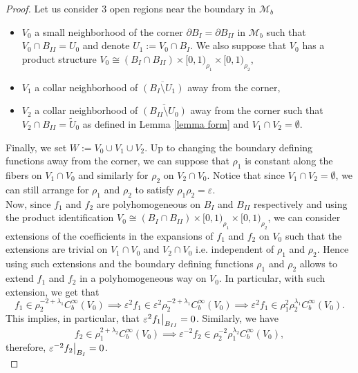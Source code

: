 \documentclass[a4paper,11pt]{article}
\newcommand\restr[2]{{%
  \left.\kern-\nulldelimiterspace %
  #1 %
  \littletaller %
  \right|_{#2} %
  }}
\newcommand{\littletaller}{\mathchoice{\vphantom{\big|}}{}{}{}}
\begin{document}
\begin{proof}
Let us consider $3$ open regions near the boundary in $\mathcal{M}_b$
\begin{itemize}
    \item $V_0$ a small neighborhood of the corner $\partial B_I= \partial B_{II}$ in $\mathcal{M}_b$ such that $V_0 \cap B_{II} = U_0$ and denote $U_1 := V_0 \cap B_{I}$. We also suppose that $V_0$ has a product structure $V_0 \cong (B_I \cap B_{II}) \times [0,1)_{\rho_1} \times  [0,1)_{\rho_2}$,
    \item $V_1$ a collar neighborhood of $\overline{(B_{I} \setminus U_1)}$ away from the corner,
    \item $V_2$ a collar neighborhood of $\overline{(B_{II} \setminus U_0)}$ away from the corner such that $V_2 \cap B_{II} = \tilde U_0$ as defined in Lemma \ref{lemma form} and $V_1 \cap V_2 = \emptyset$.
\end{itemize} 
Finally, we set $W:= V_0 \cup V_1 \cup V_2$. Up to changing the boundary defining functions away from the corner, we can suppose that $\rho_1$ is constant along the fibers on $V_1 \cap V_0$ and similarly for $\rho_2$ on $V_2 \cap V_0$. Notice that since $V_1 \cap V_2 = \emptyset$, we can still arrange for $\rho_1$ and $\rho_2$ to satisfy $\rho_1 \rho_2 = \varepsilon$.\\
 
 Now, since $ f_1$ and $f_2$ are polyhomogeneous on $B_{I}$ and $B_{II}$ respectively and using the product identification $V_0 \cong (B_I \cap B_{II}) \times [0,1)_{\rho_1} \times  [0,1)_{\rho_2}$,
 we can consider extensions of the coefficients in the expansions of $f_1$ and $f_2$ on $V_0$ such that the extensions are trivial on $V_1 \cap V_0$ and $V_2 \cap V_0$ i.e. independent of $\rho_1$ and $\rho_2$. Hence using such extensions and the boundary defining functions $\rho_1$ and $\rho_2$ allows to extend $ f_1$ and $f_2$ in a polyhomogeneous way on $V_0$. In particular, with such extension, we get that
 $$
 f_1\in \rho_2^{-2+ \lambda_1} C_b^\infty(V_0) \implies  \varepsilon^2 f_1 \in \varepsilon^2 \rho_2^{-2 + \lambda_1} C_b^\infty( V_0) \implies \varepsilon^2 f_1 \in \rho_1^{2} \rho_2^{\lambda_1} C_b^\infty( V_0). 
 $$   
This implies, in particular, that $\restr{\varepsilon^2 f_1}{B_{II}} =0$. Similarly, we have 
$$
f_2 \in \rho_1^{2+ \lambda_2} C_b^\infty(V_0) \implies \varepsilon^{-2} f_2 \in \rho_2^{-2} \rho_1^{\lambda_2} C_b^\infty(V_0),
$$
therefore, $\restr{\varepsilon^{-2} f_2}{B_{I}}=0$. \\


\end{proof}
\end{document}
